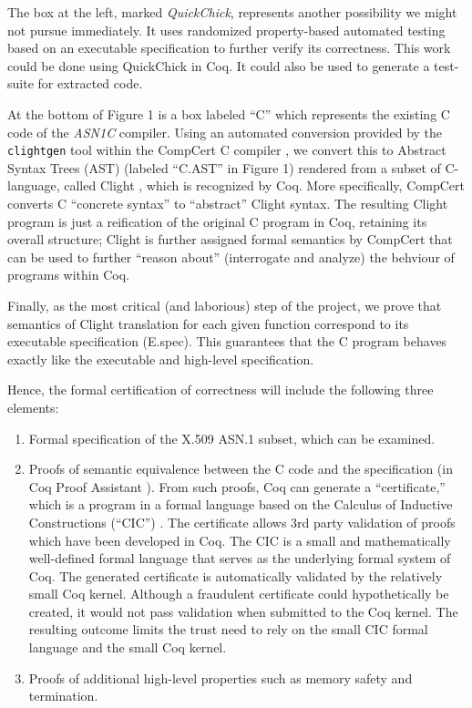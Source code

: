 \documentclass[acmsmall,nonacm]{acmart}
\begin{document}
The box at the left, marked \textit{QuickChick}, represents another
possibility we might not pursue immediately. It uses randomized
property-based automated testing based on an executable
specification to further verify its correctness. This work could be
done using QuickChick \cite{QuickChick} in Coq. It could also be used
to generate a test-suite for extracted code.

At the bottom of Figure 1 is a box labeled ``C'' which represents the
existing C code of the \emph{ASN1C} compiler. Using an automated conversion
provided by the \texttt{clightgen} tool within the CompCert C compiler
\cite{CompCert}, we convert this to Abstract Syntax Trees (AST)
\cite{AST} (labeled ``C.AST'' in Figure 1) rendered from a subset
of C-language, called Clight \cite{Mechanized}, which is recognized by Coq. More specifically,
CompCert converts C ``concrete syntax'' to ``abstract'' Clight
syntax. The resulting Clight program is just a reification of the
original C program in Coq, retaining its overall structure; Clight is further assigned formal semantics
by CompCert that can be used to further ``reason about'' (interrogate
and analyze) the behviour of programs within Coq.

Finally, as the most critical (and laborious) step of the project, we
prove that semantics of Clight
translation for each given function correspond to its executable
specification (E.spec). This guarantees that the C program behaves exactly
like the executable and high-level specification.

Hence, the formal certification of correctness will include the following
three elements:

\begin{enumerate}[label=(\alph*)]

\item Formal specification of the X.509 ASN.1 subset, which can be examined.

\item Proofs of semantic equivalence between the C code and the
  specification (in Coq Proof Assistant \cite{Coq}). From such
  proofs, Coq can generate a ``certificate,'' which is a program in a
  formal language based on the Calculus of Inductive Constructions
  (``CIC'') \cite{CIC}. The certificate allows 3rd party
  validation of proofs which have been developed in Coq. The CIC is a small and mathematically
  well-defined formal language that serves as the underlying formal
  system of Coq. The generated certificate is automatically validated
  by the relatively small Coq kernel. Although a fraudulent
  certificate could hypothetically be created, it would not pass
  validation when submitted to the Coq kernel. The resulting outcome
  limits the trust need to rely on the small CIC formal language and
  the small Coq kernel.

\item Proofs of additional high-level properties such as memory safety
  and termination.

\end{enumerate}
  
\end{document}
